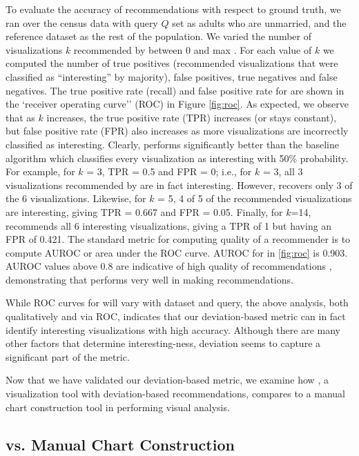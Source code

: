 To evaluate the accuracy of \SeeDB recommendations with respect to ground truth, 
we ran \SeeDB over the census data with query $Q$ set as adults who are unmarried, 
and the reference dataset as the rest of the population.
We varied the number of visualizations $k$ recommended by \SeeDB between 0 and
max .
For each value of $k$ we computed the number of true positives (\SeeDB recommended
visualizations that were classified as ``interesting'' by majority), false
positives, true negatives and false negatives.
The true positive rate (recall) and false positive rate for \SeeDB are shown 
in the `receiver operating curve'' (ROC)\cite{} in Figure \ref{fig:roc}.
As expected, we observe that as $k$ increases, the true positive rate (TPR)
increases (or stays constant), but false positive rate (FPR) also increases as 
more visualizations are incorrectly classified as interesting.
Clearly, \SeeDB performs significantly better than the baseline algorithm which 
classifies every visualization as interesting with 50\% probability.
For example, for $k$ = 3, TPR = 0.5 and FPR = 0;
i.e., for $k$ = 3, all 3 visualizations recommended by \SeeDB are in fact interesting.
However, \SeeDB recovers only 3 of the 6 visualizations.
Likewise, for $k$ = 5, 4 of 5 of the recommended visualizations are interesting, giving
TPR = 0.667 and FPR = 0.05.
Finally, for $k$=14, \SeeDB recommends all 6 interesting visualizations, giving a 
TPR of 1 but having an FPR of 0.421.
The standard metric for computing quality of a recommender is to
compute AUROC or area under the ROC curve.
AUROC for \SeeDB in \ref{fig:roc} is 0.903.
AUROC values above 0.8 are indicative of
high quality of recommendations \cite{}, demonstrating that \SeeDB performs very well in
making recommendations.

While ROC curves for \SeeDB will vary with dataset and query, the above analysis, both
qualitatively and via ROC, indicates that our deviation-based metric can in fact identify
interesting visualizations with high accuracy.
Although there are many other factors that determine interesting-ness, deviation seems
to capture a significant part of the metric. 

Now that we have validated our deviation-based metric, we examine how \SeeDB, a visualization tool
with deviation-based recommendations, compares to a manual chart construction tool in performing
visual analysis.

\subsection{\SeeDB vs. Manual Chart Construction}
\label{sec:seedb_vs_manual}

